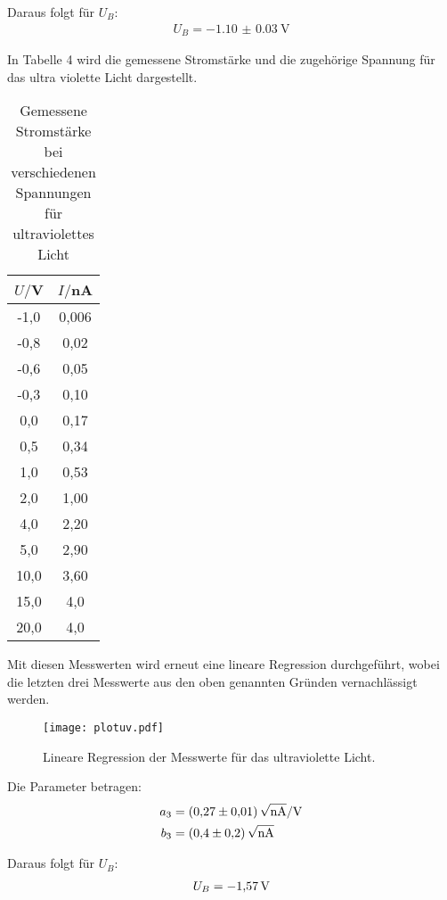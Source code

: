 Daraus folgt für $U_B$:
\begin{align*}
  U_B = \SI{-1.10(3)}{\volt}
\end{align*}

In Tabelle 4 wird die gemessene Stromstärke und die zugehörige Spannung für das ultra violette Licht dargestellt.

\begin{table}[H]
  \centering
  \caption{Gemessene Stromstärke bei verschiedenen Spannungen für ultraviolettes Licht}
  \label{tab:Spannungsamplitude}
  \begin{tabular}{c c}
    \toprule
    $U/$V & $I/$nA \\
    \midrule
    -1,0 &	0,006 \\
    -0,8 &	0,02 \\
    -0,6 &	0,05 \\
    -0,3 &	0,10 \\
    0,0 &	0,17 \\
    0,5   &  0,34 \\
    1,0	 &  0,53 \\
    2,0	 &  1,00 \\
    4,0	 &  2,20 \\
    5,0	 &  2,90 \\
    10,0 &  3,60 \\
    15,0 &  4,0 \\
    20,0 & 4,0 \\
    \bottomrule
  \end{tabular}
\end{table}

Mit diesen Messwerten wird erneut eine lineare Regression durchgeführt, wobei die letzten drei Messwerte
aus den oben genannten Gründen vernachlässigt werden.

\begin{figure}[H]
  \centering
  \texttt{[image: plotuv.pdf]}
  \caption{Lineare Regression der Messwerte für das ultraviolette Licht.}
  \label{fig:plotuv}
\end{figure}

Die Parameter betragen:
\begin{align*}
  a_3 &= \SI{0.27(1)}{\sqrt{\nano\ampere}\per\volt} \\
  b_3 &= \SI{0.4(2)}{\sqrt{\nano\ampere}}
\end{align*}

Daraus folgt für $U_B$:
\begin{align*}
  U_B = \SI{-1.5{7}}{\volt}
\end{align*}


